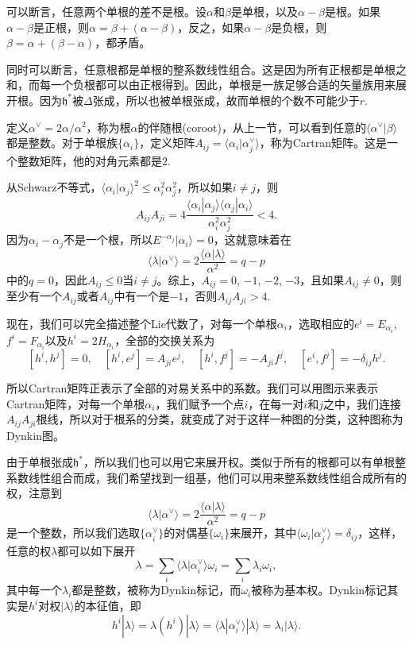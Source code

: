 \documentclass[9pt]{extarticle}
\begin{document}
\para 可以断言，任意两个单根的差不是根。设$\alpha$和$\beta$是单根，以及$\alpha-\beta$是根。如果$\alpha-\beta$是正根，则$\alpha=\beta+(\alpha-\beta)$，反之，如果$\alpha-\beta$是负根，则$\beta=\alpha+(\beta-\alpha)$，都矛盾。

同时可以断言，任意根都是单根的整系数线性组合。这是因为所有正根都是单根之和，而每一个负根都可以由正根得到。因此，单根是一族足够合适的矢量族用来展开根。因为$\mathfrak{h}^*$被$\Delta$张成，所以也被单根张成，故而单根的个数不可能少于$r$. 

\para 定义$\alpha^\vee=2\alpha/\alpha^2$，称为根$\alpha$的伴随根(coroot)，从上一节，可以看到任意的$\langle \alpha^\vee|\beta\rangle$都是整数。对于单根族$\{\alpha_i\}$，定义矩阵$A_{ij}=\langle \alpha_i|\alpha^\vee_j\rangle$，称为Cartran矩阵。这是一个整数矩阵，他的对角元素都是$2$.

从Schwarz不等式，$\langle \alpha_i|\alpha_j\rangle^2\leq \alpha_i^2\alpha_j^2$，所以如果$i\neq j$，则
\[
	A_{ij}A_{ji}=4\frac{\langle \alpha_i|\alpha_j\rangle\langle \alpha_j|\alpha_i\rangle}{\alpha_i^2\alpha_j^2}<4.
\]
因为$\alpha_i-\alpha_j$不是一个根，所以$E^{-\alpha_j}|\alpha_i\rangle =0$，这就意味着在
\[
	\langle \lambda|\alpha^\vee\rangle =2\frac{\langle\alpha|\lambda\rangle}{\alpha^2}=q-p
\]
中的$q=0$，因此$A_{ij}\leq 0$当$i\neq j$。综上，$A_{ij}=0$, $-1$, $-2$, $-3$，且如果$A_{ij}\neq 0$，则至少有一个$A_{ij}$或者$A_{ij}$中有一个是$-1$，否则$A_{ij}A_{ji}>4$.


\para 现在，我们可以完全描述整个Lie代数了，对每一个单根$\alpha_i$，选取相应的$e^i=E_{\alpha_i}$, $f^{i}=F_{\alpha_i}$以及$h^i=2H_{\alpha_i}$，全部的交换关系为
\[
	[h^i,h^j]=0,\quad [h^i,e^j]=A_{ji}e^j,\quad [h^i,f^j]=-A_{ji}f^j,\quad [e^i,f^j]=-\delta_{ij}h^j.
\]

所以Cartran矩阵正表示了全部的对易关系中的系数。我们可以用图示来表示Cartran矩阵，对每一个单根$\alpha_i$，我们赋予一个点$i$，在每一对$i$和$j$之中，我们连接$A_{ij}A_{ji}$根线，所以对于根系的分类，就变成了对于这样一种图的分类，这种图称为Dynkin图。

\para 由于单根张成$\mathfrak{h}^*$，所以我们也可以用它来展开权。类似于所有的根都可以有单根整系数线性组合而成，我们希望找到一组基，他们可以用来整系数线性组合成所有的权，注意到
\[
	\langle\lambda|\alpha^\vee\rangle=2\frac{\langle\alpha|\lambda\rangle}{\alpha^2}=q-p
\]
是一个整数，所以我们选取$\{\alpha_i^\vee\}$的对偶基$\{\omega_i\}$来展开，其中$\langle \omega_i|\alpha_j^\vee\rangle=\delta_{ij}$，这样，任意的权$\lambda$都可以如下展开
\[
	\lambda=\sum_i \langle \lambda|\alpha_i^\vee\rangle \omega_i=\sum_i \lambda_i \omega_i,
\]
其中每一个$\lambda_i$都是整数，被称为Dynkin标记，而$\omega_i$被称为基本权。Dynkin标记其实是$h^i$对权$|\lambda \rangle$的本征值，即
\[
	h^i|\lambda \rangle=\lambda(h^i)|\lambda \rangle=\langle\lambda|\alpha_i^\vee\rangle|\lambda \rangle=\lambda_i|\lambda \rangle.
\]
\end{document}
